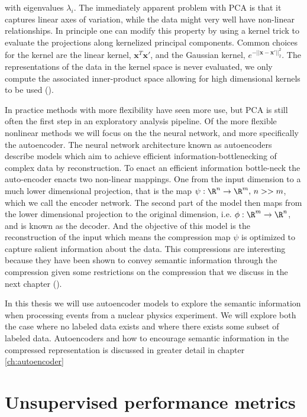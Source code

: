 \noindent with eigenvalues $\lambda_i$. The immediately apparent problem with PCA is that it captures linear axes of variation, while the data might very well have non-linear relationships. In principle one can modify this property by using a kernel trick to evaluate the projections along kernelized principal components. Common choices for the kernel are the linear kernel, $\mathbf{x}^T\mathbf{x}'$, and the Gaussian kernel, $e^{-||\mathbf{x} - \mathbf{x}'||^2_2}$. The representations of the data in the kernel space is never evaluated, we only compute the associated inner-product space allowing for high dimensional kernels to be used (\cite{Scholkopf1996}). 

In practice methods with more flexibility have seen more use, but PCA is still often the first step in an exploratory analysis pipeline. Of the more flexible nonlinear methods we will focus on the the neural network, and more specifically the autoencoder. The neural network architecture known as autoencoders describe models which aim to achieve efficient information-bottlenecking of complex data by reconstruction. To enact an efficient information bottle-neck the auto-encoder enacts two non-linear mappings. One from the input dimension to a much lower dimensional projection, that is the map $\psi: \R^n \rightarrow \R^m,\, n >> m$, which we call the encoder network. The second part of the model then maps from the lower dimensional projection to the original dimension, i.e. $\phi: \R^m \rightarrow \R^n$, and is known as the decoder. And the objective of this model is the reconstruction of the input which means the compression map $\psi$ is optimized to capture salient information about the data. This compressions are interesting because they have been shown to convey semantic information through the compression given some restrictions on the compression that we discuss in the next chapter (\cite{Fertig}).

In this thesis we will use autoencoder models to explore the semantic information when processing events from a nuclear physics experiment. We will explore both the case where no labeled data exists and where there exists some subset of labeled data. Autoencoders and how to encourage semantic information in the compressed representation is discussed in greater detail in chapter \ref{ch:autoencoder}

\section{Unsupervised performance metrics}\label{sec:unsupervised_perf}

